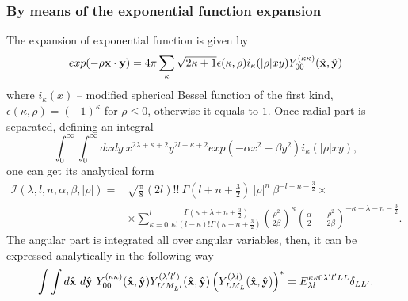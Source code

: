 \documentclass[12pt,a4paper,twoside]{article}
\begin{document}
\subsubsection{By means of the  exponential function expansion}
The expansion of exponential function is given by 
\begin{equation}
exp(-\rho {\bf x} \cdot {\bf y}) = 4 \pi \sum_{\kappa} \sqrt{2\kappa+1} 
\epsilon(\kappa, \rho)i_{\kappa}(|\rho|xy)Y_{00}^{(\kappa\kappa)}(\hat{{\bf x}},\hat{{\bf y}})
\end{equation} 
where $i_{\kappa}(x) $ -- modified spherical Bessel function of the first kind, $\epsilon(\kappa, \rho)=(-1)^{\kappa}$ for $\rho \le 0$, otherwise it equals to $1$.
Once radial part is separated, defining an integral
\begin{equation}
\int_0^\infty \int_0^\infty  dx dy~ x^{2\lambda+\kappa+2}y^{2 l +\kappa+2} exp\left( -\alpha x^2 - \beta y^2 \right) i_{\kappa}(|\rho|xy),
\end{equation}
one can get its analytical form
\begin{align}
\mathcal{I}(\lambda, l, n, \alpha, \beta, |\rho|) =& \sqrt{\frac{\pi}{8}}(2l)!!~ \Gamma(l+n+\tfrac{3}{2})~|\rho|^{n} ~\beta^{-l-n-\tfrac{3}{2}} \times \nonumber \\
& \times \sum_{\kappa=0}^{l} \frac{\Gamma(\kappa+\lambda+n+\tfrac{3}{2})}{\kappa! (l-\kappa)! \Gamma(\kappa+n+\tfrac{3}{2})}
\left(\frac{\rho^2}{2\beta}\right)^{\kappa} \left( \frac{\alpha}{2} - \frac{\rho^2}{2\beta}  \right)^{-\kappa-\lambda-n-\tfrac{3}{2}}.
\end{align}
The angular part is integrated all over angular variables, then,  it can be expressed analytically in the following way
\begin{equation}
\int \int d\hat{\bf x}~d\hat{\bf y}~ Y_{00}^{(\kappa\kappa)}(\hat{{\bf x}},\hat{{\bf y}})  Y_{L^{\prime}M_{L^{\prime}}}^{(\lambda^{\prime} l^{\prime})}(\hat{{\bf x}},\hat{{\bf y}}) \left(  Y_{LM_L}^{(\lambda l)}(\hat{{\bf x}},\hat{{\bf y}}) \right)^{*} = {E}^{\kappa \kappa 0 \lambda^{\prime} l^{\prime} L L}_{\lambda l} \delta_{LL^{\prime}}.
\end{equation}
\end{document}
